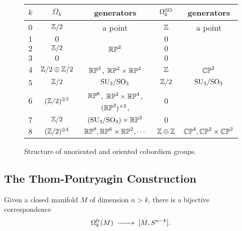 \begin{figure}[ht]
	\renewcommand{\arraystretch}{1.2}
	\centering
	\begin{tabular}{r||c|c||c|c}
		$k$ & $\Omega_k$          & generators                                          & $\Omega_k^{\mathrm{SO}}$ & generators                 \\
		\hline
		$0$ & $\mathbb{Z}/2$              & a point                                             & $\mathbb{Z}$           & a point                    \\
		$1$ & $0$                 &                                                     & $0$            &                            \\
		$2$ & $\mathbb{Z}/2$              & $\mathbb{RP}^2$                                             & $0$            &                            \\
		$3$ & $0$                 &                                                     & $0$            &                            \\
		$4$ & $\mathbb{Z}/2\oplus \mathbb{Z}/2$   & $\mathbb{RP}^4$, $\mathbb{RP}^2\times \mathbb{RP}^2$                        & $\mathbb{Z}$           & $\mathbb{CP}^2$                    \\
		$5$ & $\mathbb{Z}/2$              & $\mathrm{SU}_3/\mathrm{SO}_3$                                       & $\mathbb{Z}/2$         & $\mathrm{SU}_3/\mathrm{SO}_3$              \\
		$6$ & $(\mathbb{Z}/2)^{\oplus 3}$ & $\mathbb{RP}^6$, $\mathbb{RP}^2\times \mathbb{RP}^4$, $(\mathbb{RP}^2)^{\times 3}$, & $0$            &                            \\
		$7$ & $\mathbb{Z}/2$              & $(\mathrm{SU}_3/\mathrm{SO}_3) \times \mathbb{RP}^2$                        & $0$            &                            \\
		$8$ & $(\mathbb{Z}/2)^{\oplus 4}$ & $\mathbb{RP}^8, \mathbb{RP}^6\times \mathbb{RP}^2, \cdots$                  & $\mathbb{Z}\oplus \mathbb{Z}$  & $\mathbb{CP}^4, \mathbb{CP}^2\times \mathbb{CP}^2$ \\
	\end{tabular}
	\medskip
	\caption{Structure of unoriented and oriented cobordism groups.}\label{fig:cobordism-structure-table}
\end{figure}

\subsection{The Thom-Pontryagin Construction}

\begin{theorem}
	Given a closed manifold $M$ of dimension $n>k$, there is a bijective correspondence
	\begin{equation}
		\Omega^\fr_k(M) \lkxto[] [M, S^{n-k}].
	\end{equation}
\end{theorem}

